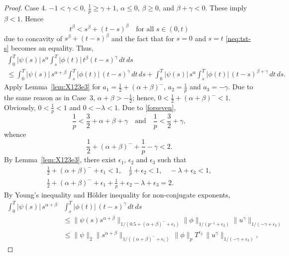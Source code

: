 \documentclass{article}
\theoremstyle{plain}
\theoremstyle{remark}
\theoremstyle{definition}
\begin{document}
\begin{proof}
Case 4. $-1<\gamma<0$, $\frac1p\ge\gamma+1$,
$\alpha\le 0$, $\beta\ge 0$, and
$\beta+\gamma<0$.
These imply $\beta<1$.
Hence
\begin{equation}
\label{neq:tst-s}
t^\beta < s^\beta + (t-s)^\beta
\quad \mbox{for all $s\in(0,t)$}
\end{equation}
due to concavity of $s^\beta + (t-s)^\beta$
and the fact that for $s=0$ and $s=t$
\eqref{neq:tst-s} becomes an equality.
Thus,
\begin{multline*}
		\int_0^T |\psi(s)|\, s^\alpha
		\int_s^T |\phi(t)|\, t^\beta (t{-}s)^\gamma
		\, dt \, ds
\\ \le
		\int_0^T\! |\psi(s)|\, s^{\alpha+\beta}
		\int_s^T\! |\phi(t)|\, (t{-}s)^\gamma
		\, dt \, ds
+
		\int_0^T\! |\psi(s)|\, s^\alpha
		\int_s^T\! |\phi(t)|\, (t{-}s)^{\beta+\gamma}
		\, dt \, ds .
\end{multline*}
Apply Lemma~\ref{lem:X123e3}
for $a_1 =\frac12 + (\alpha+\beta)^-$,
$a_2=\frac{1}{p}$ and $a_3 = -\gamma$.
Due to the same reason as in Case~3,
$\alpha+\beta>-\frac12$; hence,
$0<\frac12 + (\alpha+\beta)^-<1$.
Obviously, $0<\frac1p<1$ and $0<-\lambda<1$.
Due to \eqref{forseven},
\[
\frac1p < \frac32 + \alpha + \beta + \gamma
\quad \mbox{and} \quad
\frac1p < \frac32 + \gamma,
\]
whence
\[
\frac12 + (\alpha+\beta)^- + \frac1p - \gamma < 2.
\]
By Lemma~\ref{lem:X123e3}, there exist
$\epsilon_1$, $\epsilon_2$ and
$\epsilon_3$ such that
\begin{gather*}
\frac12 + (\alpha+\beta)^- + \epsilon_1
< 1, \quad
\frac{1}p + \epsilon_2 <1, \quad
-\lambda + \epsilon_3 < 1, \\
\frac12 + (\alpha+\beta)^- + \epsilon_1
+
\frac{1}p + \epsilon_2
-\lambda + \epsilon_3 = 2.
\end{gather*}
By Young's inequality and H\"older inequality
for non-conjugate exponents,
	\begin{align*}
		\int_0^T |\psi(s)|\, s^{\alpha+\beta}
		&\int_s^T |\phi(t)|\, (t{-}s)^\gamma
		\, dt \, ds
\\ &\le
\|\psi(s) s^{\alpha+\beta}\|_{1/(0.5+(\alpha+\beta)^- + \epsilon_1)}
\|\phi\|_{1/(p^{-1}+\epsilon_2)}
\|u^\gamma\|_{1/(-\gamma+\epsilon_3)}
\\ &\le
\|\psi\|_2 \|s^{\alpha+\beta}\|_{1/((\alpha+\beta)^- + \epsilon_1)} \,
\|\phi\|_p T^{\epsilon_2} \,
\|u^\gamma\|_{1/(-\gamma+\epsilon_3)},
\end{align*}


\end{proof}
\end{document}
